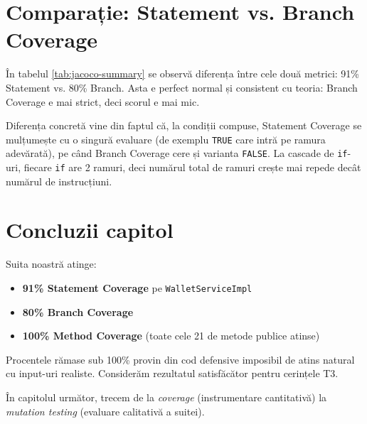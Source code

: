 \section{Comparație: Statement vs. Branch Coverage}

În tabelul \ref{tab:jacoco-summary} se observă diferența între cele două metrici: 91\% Statement vs. 80\% Branch. Asta e perfect normal și consistent cu teoria: Branch Coverage e mai strict, deci scorul e mai mic.

Diferența concretă vine din faptul că, la condiții compuse, Statement Coverage se mulțumește cu o singură evaluare (de exemplu \texttt{TRUE} care intră pe ramura adevărată), pe când Branch Coverage cere și varianta \texttt{FALSE}. La cascade de \texttt{if}-uri, fiecare \texttt{if} are 2 ramuri, deci numărul total de ramuri crește mai repede decât numărul de instrucțiuni.

\section{Concluzii capitol}

Suita noastră atinge:

\begin{itemize}
    \item \textbf{91\% Statement Coverage} pe \texttt{WalletServiceImpl}
    \item \textbf{80\% Branch Coverage}
    \item \textbf{100\% Method Coverage} (toate cele 21 de metode publice atinse)
\end{itemize}

Procentele rămase sub 100\% provin din cod defensive imposibil de atins natural cu input-uri realiste. Considerăm rezultatul satisfăcător pentru cerințele T3.

În capitolul următor, trecem de la \textit{coverage} (instrumentare cantitativă) la \textit{mutation testing} (evaluare calitativă a suitei).
